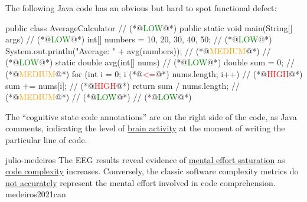 \documentclass{article}
\begin{document}
The following Java code has an obvious but hard to spot functional defect:
\par
{\scriptsize\begin{ffcode}[columns=flexible]
public class AverageCalculator {                             // (*@\textcolor{green}{LOW}@*)
  public static void main(String[] args) {                   // (*@\textcolor{green}{LOW}@*)
    int[] numbers = {10, 20, 30, 40, 50};                    // (*@\textcolor{green}{LOW}@*)
    System.out.println("Average: " + avg(numbers));          // (*@\textcolor{orange}{MEDIUM}@*)
  }                                                          // (*@\textcolor{green}{LOW}@*)
  static double avg(int[] nums) {                            // (*@\textcolor{green}{LOW}@*)
    double sum = 0;                                          // (*@\textcolor{orange}{MEDIUM}@*)
    for (int i = 0; i (*@\textcolor{red}{<=}@*) nums.length; i++)                   // (*@\textcolor{red}{HIGH}@*)
      sum += nums[i];                                        // (*@\textcolor{red}{HIGH}@*)
    return sum / nums.length;                                // (*@\textcolor{orange}{MEDIUM}@*)
  }                                                          // (*@\textcolor{green}{LOW}@*)
}                                                            // (*@\textcolor{green}{LOW}@*)
\end{ffcode}
}
\par
The ``cognitive state code annotations'' are on the right side of the code, as Java comments, indicating the level of \ul{brain activity} at the moment of writing the particular line of code.
\plush{}

\qte
  {julio-medeiros}
  {The EEG results reveal evidence of \ul{mental effort saturation} as \ul{code complexity} increases. Conversely, the classic software complexity metrics do \ul{not accurately} represent the mental effort involved in code comprehension.}
  {medeiros2021can}
\end{document}
